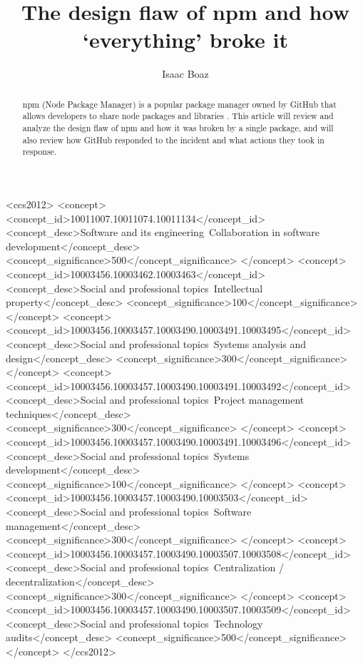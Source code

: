 \documentclass[acmsmall]{acmart}
\begin{document}
\title{The design flaw of npm and how `everything' broke it}

\author{Isaac Boaz}

\renewcommand{\shortauthors}{Boaz}

\begin{abstract}
  npm (Node Package Manager) is a popular package manager owned by GitHub that
  allows developers to share node packages and libraries \cite{npm}. This article will
  review and analyze the design flaw of npm and how it was broken by a single
  package, and will also review how GitHub responded to the incident and what
  actions they took in response.
\end{abstract}


\begin{CCSXML}
  <ccs2012> <concept> <concept_id>10011007.10011074.10011134</concept_id>
  <concept_desc>Software and its engineering~Collaboration in software
  development</concept_desc> <concept_significance>500</concept_significance>
  </concept> <concept> <concept_id>10003456.10003462.10003463</concept_id>
  <concept_desc>Social and professional topics~Intellectual
  property</concept_desc> <concept_significance>100</concept_significance>
  </concept> <concept>
  <concept_id>10003456.10003457.10003490.10003491.10003495</concept_id>
  <concept_desc>Social and professional topics~Systems analysis and
  design</concept_desc> <concept_significance>300</concept_significance>
  </concept> <concept>
  <concept_id>10003456.10003457.10003490.10003491.10003492</concept_id>
  <concept_desc>Social and professional topics~Project management
  techniques</concept_desc> <concept_significance>300</concept_significance>
  </concept> <concept>
  <concept_id>10003456.10003457.10003490.10003491.10003496</concept_id>
  <concept_desc>Social and professional topics~Systems
  development</concept_desc> <concept_significance>100</concept_significance>
  </concept> <concept>
  <concept_id>10003456.10003457.10003490.10003503</concept_id>
  <concept_desc>Social and professional topics~Software
  management</concept_desc> <concept_significance>300</concept_significance>
  </concept> <concept>
  <concept_id>10003456.10003457.10003490.10003507.10003508</concept_id>
  <concept_desc>Social and professional topics~Centralization /
  decentralization</concept_desc>
  <concept_significance>300</concept_significance> </concept> <concept>
  <concept_id>10003456.10003457.10003490.10003507.10003509</concept_id>
  <concept_desc>Social and professional topics~Technology audits</concept_desc>
  <concept_significance>500</concept_significance> </concept> </ccs2012>
\end{CCSXML}
\end{document}
